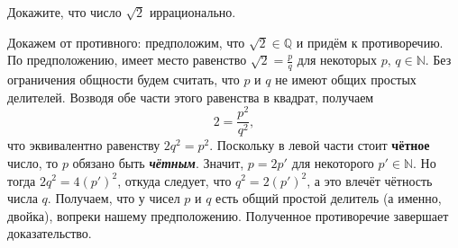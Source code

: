 \begin{task}{1}
Докажите, что число $\sqrt{2}$ иррационально.
\end{task}

\begin{solution}
Докажем от противного: предположим, что $\sqrt{2}\in\mathbb{Q}$ и придём к противоречию. По предположению, имеет место равенство $\sqrt{2}=\frac{p}{q}$ для некоторых $p,\,q\in\mathbb{N}$. Без ограничения общности будем считать, что $p$ и $q$ не имеют общих простых делителей. Возводя обе части этого равенства в квадрат, получаем \[ 2 = \frac{p^2}{q^2}, \] что эквивалентно равенству $2q^2=p^2$. Поскольку в левой части стоит \textbf{чётное} число, то $p$ обязано быть \textbf{\textit{чётным}}. Значит, $p=2p'$ для некоторого $p'\in\mathbb{N}$. Но тогда $2q^2=4(p')^2$, откуда следует, что $q^2=2(p')^2$, а это влечёт чётность числа $q$. Получаем, что у чисел $p$ и $q$ есть общий простой делитель (а именно, двойка), вопреки нашему предположению. Полученное противоречие завершает доказательство.
\end{solution}